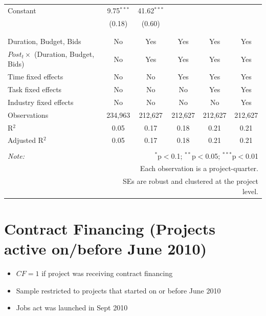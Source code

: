 \documentclass[
]{article}
\providecommand{\tightlist}{%
  \setlength{\itemsep}{0pt}\setlength{\parskip}{0pt}}
\begin{document}
\begin{table}[H]
\begin{tabular}{@{\extracolsep{-2pt}}lccccc}
 Constant & 9.75$^{***}$ & 41.62$^{***}$ &  &  &  \\ 
  & (0.18) & (0.60) &  &  &  \\ 
  & & & & & \\ 
\hline \\[-1.8ex] 
Duration, Budget, Bids & No & Yes & Yes & Yes & Yes \\ 
$Post_t \times $  (Duration, Budget, Bids) & No & Yes & Yes & Yes & Yes \\ 
Time fixed effects & No & No & Yes & Yes & Yes \\ 
Task fixed effects & No & No & No & Yes & Yes \\ 
Industry fixed effects & No & No & No & No & Yes \\ 
Observations & 234,963 & 212,627 & 212,627 & 212,627 & 212,627 \\ 
R$^{2}$ & 0.05 & 0.17 & 0.18 & 0.21 & 0.21 \\ 
Adjusted R$^{2}$ & 0.05 & 0.17 & 0.18 & 0.21 & 0.21 \\ 
\hline 
\hline \\[-1.8ex] 
\textit{Note:}  & \multicolumn{5}{r}{$^{*}$p$<$0.1; $^{**}$p$<$0.05; $^{***}$p$<$0.01} \\ 
 & \multicolumn{5}{r}{Each observation is a project-quarter.} \\ 
 & \multicolumn{5}{r}{SEs are robust and clustered at the project level.} \\ 
\end{tabular} 
\end{table}

\hypertarget{contract-financing-projects-active-onbefore-june-2010}{%
\section{Contract Financing (Projects active on/before June
2010)}\label{contract-financing-projects-active-onbefore-june-2010}}

\begin{itemize}
\tightlist
\item
  \(CF=1\) if project was receiving contract financing
\item
  Sample restricted to projects that started on or before June 2010
\item
  Jobs act was launched in Sept 2010
\end{itemize}
\end{document}
